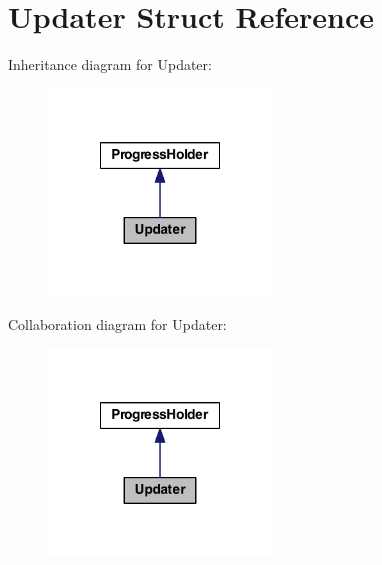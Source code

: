 \hypertarget{struct_updater}{\section{Updater Struct Reference}
\label{struct_updater}
}


Inheritance diagram for Updater\-:
\nopagebreak
\begin{figure}[H]
\begin{center}
\leavevmode
\includegraphics[width=168pt]{struct_updater__inherit__graph}
\end{center}
\end{figure}


Collaboration diagram for Updater\-:
\nopagebreak
\begin{figure}[H]
\begin{center}
\leavevmode
\includegraphics[width=168pt]{struct_updater__coll__graph}
\end{center}
\end{figure}

